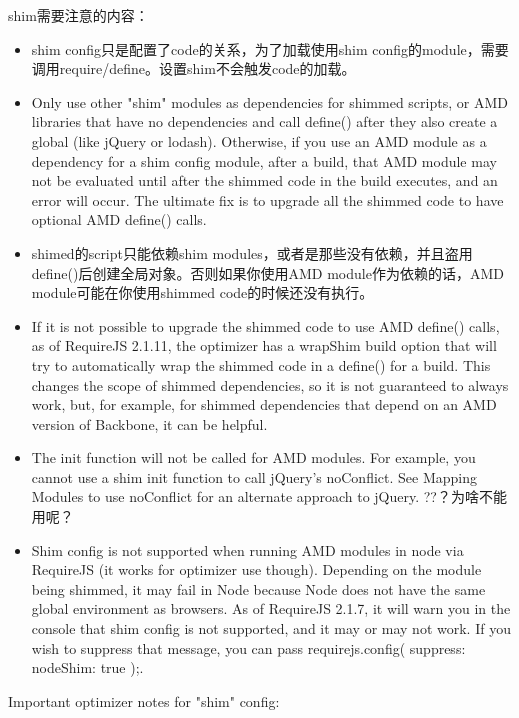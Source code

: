 shim需要注意的内容：
\begin{itemize}
\item shim config只是配置了code的关系，为了加载使用shim config的module，需要调用require/define。设置shim不会触发code的加载。
\item Only use other "shim" modules as dependencies for shimmed scripts, or AMD libraries that have no dependencies and call define() after they also create a global (like jQuery or lodash). Otherwise, if you use an AMD module as a dependency for a shim config module, after a build, that AMD module may not be evaluated until after the shimmed code in the build executes, and an error will occur. The ultimate fix is to upgrade all the shimmed code to have optional AMD define() calls.

\item shimed的script只能依赖shim modules，或者是那些没有依赖，并且盗用define()后创建全局对象。否则如果你使用AMD module作为依赖的话，AMD module可能在你使用shimmed code的时候还没有执行。

\item If it is not possible to upgrade the shimmed code to use AMD define() calls, as of RequireJS 2.1.11, the optimizer has a wrapShim build option that will try to automatically wrap the shimmed code in a define() for a build. This changes the scope of shimmed dependencies, so it is not guaranteed to always work, but, for example, for shimmed dependencies that depend on an AMD version of Backbone, it can be helpful.

\item The init function will not be called for AMD modules. For example, you cannot use a shim init function to call jQuery's noConflict. See Mapping Modules to use noConflict for an alternate approach to jQuery.   ??？为啥不能用呢？

\item Shim config is not supported when running AMD modules in node via RequireJS (it works for optimizer use though). Depending on the module being shimmed, it may fail in Node because Node does not have the same global environment as browsers. As of RequireJS 2.1.7, it will warn you in the console that shim config is not supported, and it may or may not work. If you wish to suppress that message, you can pass requirejs.config({ suppress: { nodeShim: true }});.


\end{itemize}
Important optimizer notes for "shim" config:
